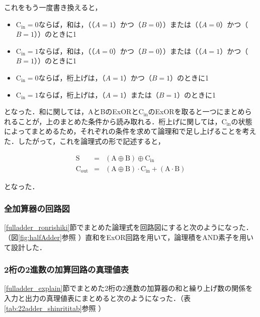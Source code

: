これをもう一度書き換えると，

\begin{itemize}
	\item $\mathrm{C_{in}}=0$ならば，和は，（（$A=1$）かつ（$B=0$））または（（$A=0$）かつ（$B=1$））のときに1
	\item $\mathrm{C_{in}}=1$ならば，和は，（（$A=0$）かつ（$B=0$））または（（$A=1$）かつ（$B=1$））のときに1
	\item $\mathrm{C_{in}}=0$ならば，桁上げは，（$A=1$）かつ（$B=1$）のときに1
	\item $\mathrm{C_{in}}=1$ならば，桁上げは，（$A=1$）または（$B=1$）のときに1
\end{itemize}

となった．和に関しては，AとBのExORと$\mathrm{C_{in}}$のExORを取ると一つにまとめられることが，上のまとめた条件から読み取れる．桁上げに関しては，$\mathrm{C_{in}}$の状態によってまとめるため，それぞれの条件を求めて論理和で足し上げることを考えた．したがって，これを論理式の形で記述すると，

\begin{eqnarray}
	\mathrm{S} &=& ( \mathrm{A} \oplus \mathrm{B} )\oplus \mathrm{C_{in}} \nonumber \\
	\mathrm{C_{out}} &=& ( \mathrm{A} \oplus \mathrm{B} ) \cdot \mathrm{C_{in}} + ( \mathrm{A} \cdot \mathrm{B} )\nonumber 
\end{eqnarray}

となった．

%
%
\subsubsection{全加算器の回路図}
\label{fulladder_kairozu}
\ref{fulladder_ronrishiki}節でまとめた論理式を回路図にすると次のようになった．（図\ref{fig:halfAdder}参照 ）直和をExOR回路を用いて，論理積をAND素子を用いて設計した．

%
%
\subsubsection{2桁の2進数の加算回路の真理値表}
\label{22adder_shinriti}
\ref{fulladder_explain}節でまとめた2桁の2進数の加算器の和と繰り上げ数の関係を入力と出力の真理値表にまとめると次のようになった．（表\ref{tab:22adder_shinrititab}参照 ）


